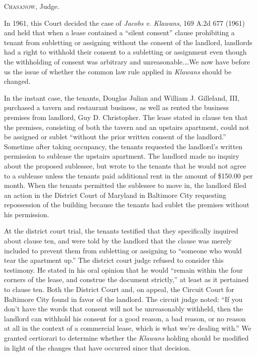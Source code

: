 

\textsc{Chasanow}, Judge.

In 1961, this Court decided the case of \textit{Jacobs v. Klawans}, 169 A.2d 677
(1961) and held that when a lease contained a ``silent consent'' clause
prohibiting a tenant from subletting or assigning without the consent of the
landlord, landlords had a right to withhold their consent to a subletting or
assignment even though the withholding of consent was arbitrary and
unreasonable.\ldots We now have before us the issue of whether the common law
rule applied in \textit{Klawans} should be changed.

In the instant case, the tenants, Douglas Julian and William J. Gilleland, III,
purchased a tavern and restaurant business, as well as rented the business
premises from landlord, Guy D. Christopher. The lease stated in clause ten that
the premises, consisting of both the tavern and an upstairs apartment, could
not be assigned or sublet ``without the prior written consent of the
landlord.'' Sometime after taking occupancy, the tenants requested the
landlord's written permission to sublease the upstairs apartment. The landlord
made no inquiry about the proposed sublessee, but wrote to the tenants that he
would not agree to a sublease unless the tenants paid additional rent in the
amount of \$150.00 per month. When the tenants permitted the sublessee to move
in, the landlord filed an action in the District Court of Maryland in Baltimore
City requesting repossession of the building because the tenants had sublet the
premises without his permission.  

At the district court trial, the tenants testified that they specifically
inquired about clause ten, and were told by the landlord that the clause was
merely included to prevent them from subletting or assigning to ``someone who
would tear the apartment up.'' The district court judge refused to consider
this testimony. He stated in his oral opinion that he would ``remain within the
four corners of the lease, and construe the document strictly,'' at least as it
pertained to clause ten. Both the District Court and, on appeal, the Circuit
Court for Baltimore City found in favor of the landlord. The circuit judge
noted: ``If you don't have the words that consent will not be unreasonably
withheld, then the landlord can withhold his consent for a good reason, a bad
reason, or no reason at all in the context of a commercial lease, which is what
we're dealing with.'' We granted certiorari to determine whether the
\textit{Klawans} holding should be modified in light of the changes that have
occurred since that decision.


